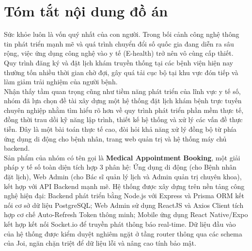 \documentclass[12pt,a4paper]{report}
\begin{document}
\chapter*{Tóm tắt nội dung đồ án}
\hspace{1em} Sức khỏe luôn là vốn quý nhất của con người. Trong bối cảnh công nghệ thông tin phát triển mạnh mẽ và quá trình chuyển đổi số quốc gia đang diễn ra sâu rộng, việc ứng dụng công nghệ vào y tế (E-health) trở nên vô cùng cấp thiết. Quy trình đăng ký và đặt lịch khám truyền thống tại các bệnh viện hiện nay thường tốn nhiều thời gian chờ đợi, gây quá tải cục bộ tại khu vực đón tiếp và làm giảm trải nghiệm của người bệnh.
\\[0.4cm] 
\indent Nhận thấy tầm quan trọng cũng như tiềm năng phát triển của lĩnh vực y tế số, nhóm đã lựa chọn đề tài xây dựng một hệ thống đặt lịch khám bệnh trực tuyến chuyên nghiệp nhằm tìm hiểu rõ hơn về quy trình phát triển phần mềm thực tế, đồng thời trau dồi kỹ năng lập trình, thiết kế hệ thống và xử lý các vấn đề thực tiễn. Đây là một bài toán thực tế cao, đòi hỏi khả năng xử lý đồng bộ từ phía ứng dụng di động cho bệnh nhân, trang web quản trị và hệ thống máy chủ backend.
\\[0.4cm]
\indent Sản phẩm của nhóm có tên gọi là \textbf{Medical Appointment Booking}, một giải pháp y tế số toàn diện tích hợp 3 phân hệ: Ứng dụng di động (cho Bệnh nhân đặt lịch), Web Admin (cho Bác sĩ quản lý lịch và Admin quản trị chuyên khoa), kết hợp với API Backend mạnh mẽ. Hệ thống được xây dựng trên nền tảng công nghệ hiện đại: Backend phát triển bằng Node.js với Express và Prisma ORM kết nối cơ sở dữ liệu PostgreSQL; Web Admin sử dụng ReactJS và Axios Client tích hợp cơ chế Auto-Refresh Token thông minh; Mobile ứng dụng React Native/Expo kết hợp kết nối Socket.io để truyền phát thông báo real-time. Dữ liệu đầu vào của hệ thống được kiểm duyệt nghiêm ngặt ở tầng router thông qua các schema của Joi, ngăn chặn triệt để dữ liệu lỗi và nâng cao tính bảo mật.

\newpage
\end{document}
